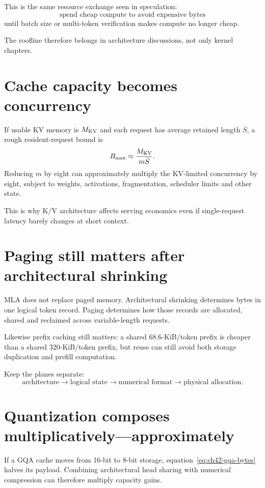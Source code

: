 This is the same resource exchange seen in speculation:
\[
\boxed{\text{spend cheap compute to avoid expensive bytes}}
\]
until batch size or multi-token verification makes compute no longer cheap.

The roofline therefore belongs in architecture discussions, not only kernel chapters.

\section{Cache capacity becomes concurrency}

If usable KV memory is $M_{\rm KV}$ and each request has average retained length
$\bar S$, a rough resident-request bound is
\[
B_{\max}\approx\frac{M_{\rm KV}}{m\bar S}.
\]
Reducing $m$ by eight can approximately multiply the KV-limited concurrency by eight,
subject to weights, activations, fragmentation, scheduler limits and other state.

This is why K/V architecture affects serving economics even if single-request latency
barely changes at short context.

\section{Paging still matters after architectural shrinking}

MLA does not replace paged memory. Architectural shrinking determines bytes in one
logical token record. Paging determines how those records are allocated, shared and
reclaimed across variable-length requests.

Likewise prefix caching still matters: a shared 68.6-KiB/token prefix is cheaper than a
shared 320-KiB/token prefix, but reuse can still avoid both storage duplication and
prefill computation.

Keep the planes separate:
\[
\text{architecture}\rightarrow\text{logical state}
\rightarrow\text{numerical format}\rightarrow\text{physical allocation}.
\]

\section{Quantization composes multiplicatively---approximately}

If a GQA cache moves from 16-bit to 8-bit storage, equation~\eqref{eq:ch42-gqa-bytes}
halves its payload. Combining architectural head sharing with numerical compression
can therefore multiply capacity gains.

